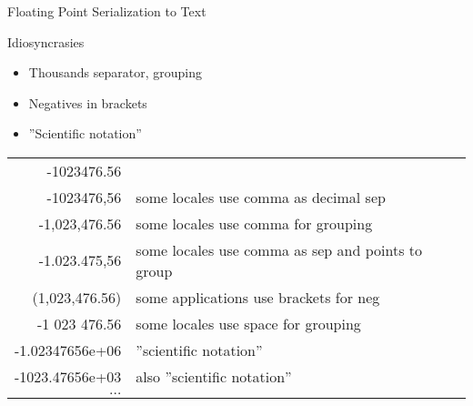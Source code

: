\documentclass[ignorenonframetext,xcolor=x11names]{beamer}
\begin{document}
\begin{frame}{Floating Point Serialization to Text}
\begin{block}{Idiosyncrasies}
\begin{itemize}
	\item Thousands separator, grouping
	\item Negatives in brackets
	\item ''Scientific notation''
\end{itemize}
\end{block}

\footnotesize
\centering
\vspace{5mm}
\renewcommand{\arraystretch}{1.25}

\begin{tabular}{r|l} \hline
-1023476.56 & \\
-1023476,56 & some locales use comma as decimal sep \\
-1,023,476.56 & some locales use comma for grouping \\
-1.023.475,56 & some locales use comma as sep and points to group \\
(1,023,476.56) & some applications use brackets for neg \\
-1 023 476.56 & some locales use space for grouping \\
-1.02347656e+06 & ''scientific notation'' \\
-1023.47656e+03 & also ''scientific notation'' \\
$\ldots$ & \\ \hline
\end{tabular}
\end{frame}
\end{document}
